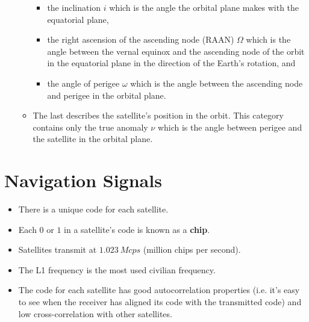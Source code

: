 \documentclass{article}
\begin{document}
\begin{itemize}
\begin{itemize}
                \begin{itemize}
                  \item the inclination $i$ which is the angle the orbital plane makes with the equatorial plane,

                  \item the right ascension of the ascending node (RAAN) $\Omega$ which is the angle between the vernal equinox and the ascending node of the orbit in the equatorial plane in the direction of the Earth's rotation, and

                  \item the angle of perigee $\omega$ which is the angle between the ascending node and perigee in the orbital plane.
                \end{itemize}

          \item The last describes the satellite's position in the orbit. This category contains only the true anomaly $\nu$ which is the angle between perigee and the satellite in the orbital plane.
        \end{itemize}
\end{itemize}

\section{Navigation Signals}

\begin{itemize}
  \item There is a unique code for each satellite.

  \item Each $0$ or $1$ in a satellite's code is known as a \textbf{chip}.

  \item Satellites transmit at $\qty{1.023}{Mcps}$ (million chips per second).

  \item The L1 frequency is the most used civilian frequency.

  \item The code for each satellite has good autocorrelation properties (i.e. it's easy to see when the receiver has aligned its code with the transmitted code) and low cross-correlation with other satellites.
\end{itemize}
\end{document}

